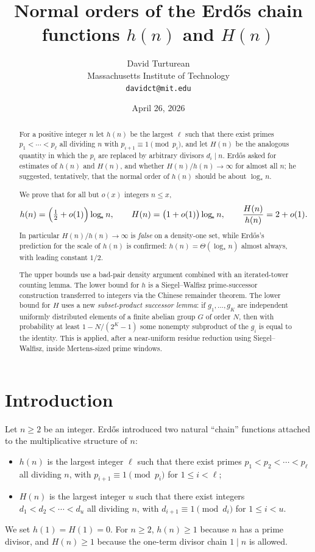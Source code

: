 \documentclass[11pt,reqno]{amsart}
\title{Normal orders of the Erd\H{o}s chain functions $h(n)$ and $H(n)$}
\author{David Turturean\\
  Massachusetts Institute of Technology\\
  \texttt{davidct@mit.edu}}
\date{April 26, 2026}
\theoremstyle{plain}
\theoremstyle{definition}
\newcommand{\logstar}{\log_{\!*}}
\begin{document}
\begin{abstract}
For a positive integer $n$ let $h(n)$ be the largest $\ell$ such that there
exist primes $p_1<\cdots<p_\ell$ all dividing $n$ with $p_{i+1}\equiv 1\pmod{p_i}$,
and let $H(n)$ be the analogous quantity in which the $p_i$ are replaced by
arbitrary divisors $d_i\mid n$. Erd\H{o}s asked
\cite{ErdosProblems696} for estimates of $h(n)$ and $H(n)$, and whether
$H(n)/h(n)\to\infty$ for almost all $n$;  he suggested, tentatively, that the normal order of $h(n)$ should be about $\logstar n$. 

We prove that for all but $o(x)$ integers $n\le x$,
\begin{equation*}
h(n) = \Bigl(\tfrac12 + o(1)\Bigr)\logstar n,
\qquad
H(n) = \bigl(1+o(1)\bigr)\logstar n,
\qquad
\frac{H(n)}{h(n)} = 2 + o(1).
\end{equation*}
In particular $H(n)/h(n)\to\infty$ is \emph{false} on a density-one set, while
Erd\H{o}s's prediction for the scale of $h(n)$ is confirmed: $h(n) = \Theta(\logstar n)$ almost always, with leading constant $1/2$.

The upper bounds use a bad-pair density argument combined with an iterated-tower
counting lemma. The lower bound for $h$ is a Siegel--Walfisz prime-successor
construction transferred to integers via the Chinese remainder theorem. The
lower bound for $H$ uses a new \emph{subset-product successor lemma}: if
$g_1,\ldots,g_K$ are independent uniformly distributed elements of a finite
abelian group $G$ of order $N$, then with probability at least
$1-N/(2^K-1)$ some nonempty subproduct of the $g_i$ is equal to the identity.
This is applied, after a near-uniform residue reduction using Siegel--Walfisz,
inside Mertens-sized prime windows.
\end{abstract}

\maketitle

\section{Introduction}

Let $n\ge 2$ be an integer. Erd\H{o}s introduced two natural ``chain'' functions
attached to the multiplicative structure of $n$:
\begin{itemize}[leftmargin=2em]
\item[(i)] $h(n)$ is the largest integer $\ell$ such that there exist primes
$p_1<p_2<\cdots<p_\ell$ all dividing $n$, with
$p_{i+1}\equiv 1 \pmod{p_i}$ for $1\le i<\ell$;
\item[(ii)] $H(n)$ is the largest integer $u$ such that there exist integers
$d_1<d_2<\cdots<d_u$ all dividing $n$, with
$d_{i+1}\equiv 1 \pmod{d_i}$ for $1\le i<u$.
\end{itemize}
We set $h(1)=H(1)=0$. For $n\ge 2$, $h(n)\ge 1$ because $n$ has a prime
divisor, and $H(n)\ge 1$ because the one-term divisor chain $1\mid n$ is
allowed.
\end{document}
